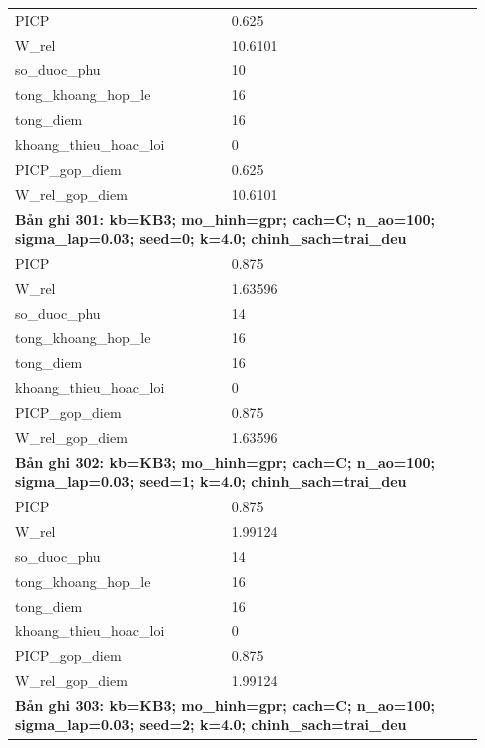 \begin{longtable}{p{0.43\linewidth}p{0.50\linewidth}}
PICP & 0.625 \\
W\_\allowbreak rel & 10.6101 \\
so\_\allowbreak duoc\_\allowbreak phu & 10 \\
tong\_\allowbreak khoang\_\allowbreak hop\_\allowbreak le & 16 \\
tong\_\allowbreak diem & 16 \\
khoang\_\allowbreak thieu\_\allowbreak hoac\_\allowbreak loi & 0 \\
PICP\_\allowbreak gop\_\allowbreak diem & 0.625 \\
W\_\allowbreak rel\_\allowbreak gop\_\allowbreak diem & 10.6101 \\
\midrule
\multicolumn{2}{p{0.95\linewidth}}{\textbf{Bản ghi 301: kb=KB3; mo\_hinh=gpr; cach=C; n\_ao=100; sigma\_lap=0.03; seed=0; k=4.0; chinh\_sach=trai\_deu}} \\
PICP & 0.875 \\
W\_\allowbreak rel & 1.63596 \\
so\_\allowbreak duoc\_\allowbreak phu & 14 \\
tong\_\allowbreak khoang\_\allowbreak hop\_\allowbreak le & 16 \\
tong\_\allowbreak diem & 16 \\
khoang\_\allowbreak thieu\_\allowbreak hoac\_\allowbreak loi & 0 \\
PICP\_\allowbreak gop\_\allowbreak diem & 0.875 \\
W\_\allowbreak rel\_\allowbreak gop\_\allowbreak diem & 1.63596 \\
\midrule
\multicolumn{2}{p{0.95\linewidth}}{\textbf{Bản ghi 302: kb=KB3; mo\_hinh=gpr; cach=C; n\_ao=100; sigma\_lap=0.03; seed=1; k=4.0; chinh\_sach=trai\_deu}} \\
PICP & 0.875 \\
W\_\allowbreak rel & 1.99124 \\
so\_\allowbreak duoc\_\allowbreak phu & 14 \\
tong\_\allowbreak khoang\_\allowbreak hop\_\allowbreak le & 16 \\
tong\_\allowbreak diem & 16 \\
khoang\_\allowbreak thieu\_\allowbreak hoac\_\allowbreak loi & 0 \\
PICP\_\allowbreak gop\_\allowbreak diem & 0.875 \\
W\_\allowbreak rel\_\allowbreak gop\_\allowbreak diem & 1.99124 \\
\midrule
\multicolumn{2}{p{0.95\linewidth}}{\textbf{Bản ghi 303: kb=KB3; mo\_hinh=gpr; cach=C; n\_ao=100; sigma\_lap=0.03; seed=2; k=4.0; chinh\_sach=trai\_deu}} \\

\end{longtable}
